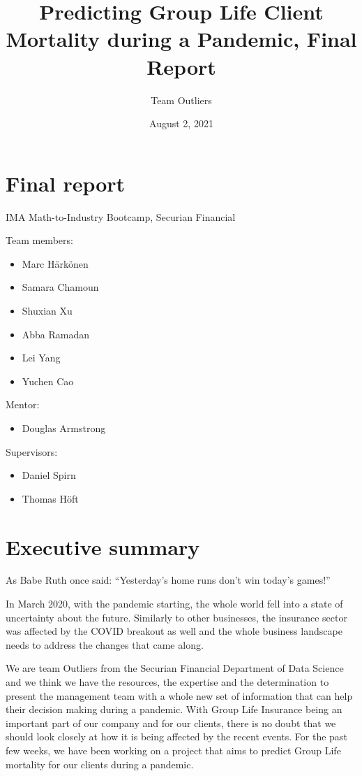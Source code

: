 \documentclass[
]{article}
\title{Predicting Group Life Client Mortality during a Pandemic, Final
Report}
\author{Team Outliers}
\date{August 2, 2021}
\providecommand{\tightlist}{%
  \setlength{\itemsep}{0pt}\setlength{\parskip}{0pt}}
\begin{document}
\maketitle

\hypertarget{final-report}{%
\section{Final report}\label{final-report}}

IMA Math-to-Industry Bootcamp, Securian Financial

Team members:

\begin{itemize}
\tightlist
\item
  Marc Härkönen
\item
  Samara Chamoun
\item
  Shuxian Xu
\item
  Abba Ramadan
\item
  Lei Yang
\item
  Yuchen Cao
\end{itemize}

Mentor:

\begin{itemize}
\tightlist
\item
  Douglas Armstrong
\end{itemize}

Supervisors:

\begin{itemize}
\tightlist
\item
  Daniel Spirn
\item
  Thomas Höft
\end{itemize}

\hypertarget{executive-summary}{%
\section{Executive summary}\label{executive-summary}}

As Babe Ruth once said: ``Yesterday's home runs don't win today's
games!''

In March 2020, with the pandemic starting, the whole world fell into a
state of uncertainty about the future. Similarly to other businesses,
the insurance sector was affected by the COVID breakout as well and the
whole business landscape needs to address the changes that came along.

We are team Outliers from the Securian Financial Department of Data
Science and we think we have the resources, the expertise and the
determination to present the management team with a whole new set of
information that can help their decision making during a pandemic. With
Group Life Insurance being an important part of our company and for our
clients, there is no doubt that we should look closely at how it is
being affected by the recent events. For the past few weeks, we have
been working on a project that aims to predict Group Life mortality for
our clients during a pandemic.
\end{document}
